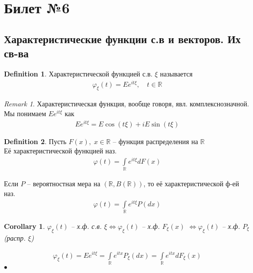 \documentclass[a4paper]{article}
\theoremstyle{plain}
\newtheorem{corollary}{Corollary}
\theoremstyle{remark}
\newtheorem*{remark}{Remark}
\theoremstyle{definition}
\newtheorem{definition}{Definition}
\renewenvironment{proof}{{\bfseries Proof}}{$\bullet$}
\newcommand{\setR}{\mathbb{R}}
\renewcommand{\phi}{\varphi}
\begin{document}
\newpage

\section{Билет №6}
\subsection{Характеристические функции с.в и векторов. Их св-ва}
\begin{definition}
  Характеристической функцией с.в. $\xi$ называется
  \begin{align*}
    \phi_{\xi} (t) = E e^{i t \xi}, \quad t \in \setR
  \end{align*}
\end{definition}

\begin{remark}
  Характеристическая функция, вообще говоря, явл. комплекснозначной. 
  Мы понимаем $E e^{i t \xi}$ как
  \begin{align*}
    E e^{i t \xi} = E \cos(t\xi) + i E \sin(t \xi)
  \end{align*}
\end{remark}

\begin{definition}
  Пусть $F(x),\; x \in \setR$ -- функция распределения на $\setR$\\
  Её характеристической функцией наз.
  \begin{align*}
    \phi(t) = \int\limits_{\setR} e^{i t \xi} dF(x)
  \end{align*}

  Если $P$ -- вероятностная мера на $(\setR, B(\setR))$, то её характеристической ф-ей наз.
  \begin{align*}
    \phi(t) = \int\limits_{\setR} e^{it\xi} P(dx)
  \end{align*}
\end{definition}

\begin{corollary}
  $\phi_\xi (t)$ -- х.ф. с.в. $\xi \iff  \phi_{\xi} (t)$ -- х.ф. $F_{\xi}(x)$
  $\iff \phi_{\xi} (t)$ -- х.ф. $P_{\xi}$ (распр. $\xi$)

  \begin{proof}
    \begin{align*}
      \phi_{\xi} (t) = E e^{i t \xi} = \int\limits_{\setR} e^{i t x} P_{\xi} (dx) 
      = \int\limits_{\setR} e^{i t x} dF_{\xi} (x)
    \end{align*}
  \end{proof}

\end{corollary}
\end{document}
